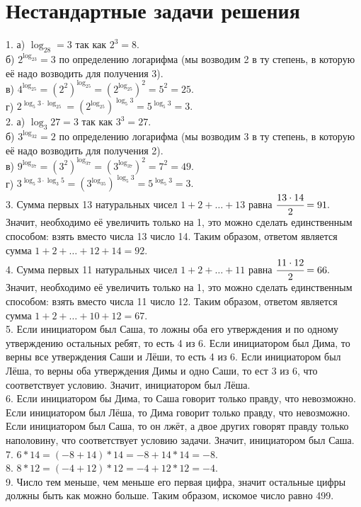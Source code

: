 \documentclass[12pt]{article}
\begin{document}
\section{Нестандартные задачи решения}
1. а) $\log_28=3$ так как $2^3=8.$\\
б) $2^{\log_23}=3$ по определению логарифма (мы возводим 2 в ту степень, в которую её надо возводить для получения 3).\\
в) $4^{\log_25}=(2^2)^{\log_25}=(2^{\log_25})^2=5^2=25.$\\
г) $2^{\log_5 3\cdot\log_25}=(2^{\log_25})^{\log_5 3}=5^{\log_5 3}=3.$\\
2. а) $\log_3 27=3$ так как $3^3=27.$\\
б) $3^{\log_32}=2$ по определению логарифма (мы возводим 3 в ту степень, в которую её надо возводить для получения 2).\\
в) $9^{\log_37}=(3^2)^{\log_37}=(3^{\log_37})^2=7^2=49.$\\
г) $3^{\log_5 3\cdot\log_3 5}=(3^{\log_35})^{\log_5 3}=5^{\log_5 3}=3.$\\
3. Сумма первых 13 натуральных чисел $1+2+\ldots+13$ равна $\cfrac{13\cdot14}{2}=91.$ Значит, необходимо её увеличить только на 1, это можно сделать единственным способом: взять вместо числа 13 число 14. Таким образом, ответом является сумма $1+2+\ldots+12+14=92.$\\
4. Сумма первых 11 натуральных чисел $1+2+\ldots+11$ равна $\cfrac{11\cdot12}{2}=66.$ Значит, необходимо её увеличить только на 1, это можно сделать единственным способом: взять вместо числа 11 число 12. Таким образом, ответом является сумма $1+2+\ldots+10+12=67.$\\
5. Если инициатором был Саша, то ложны оба его утверждения и по одному утверждению остальных ребят, то есть 4 из 6. Если инициатором был Дима, то верны все утверждения Саши и Лёши, то есть 4 из 6. Если инициатором был Лёша, то верны оба утверждения Димы и одно Саши, то ест 3 из 6, что соответствует условию. Значит, инициатором был Лёша.\\
6. Если инициатором бы Дима, то Саша говорит только правду, что невозможно. Если инициатором был Лёша, то  Дима говорит только правду, что невозможно. Если инициатором был Саша, то он лжёт, а двое других говорят правду только наполовину, что соответствует условию задачи. Значит, инициатором был Саша.\\
7. $6*14=(-8+14)*14=-8+14*14=-8.$\\
8. $8*12=(-4+12)*12=-4+12*12=-4.$\\
9. Число тем меньше, чем меньше его первая цифра, значит остальные цифры должны быть как можно больше. Таким образом, искомое число равно 499.\\
\end{document}

